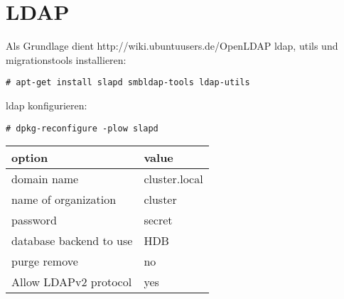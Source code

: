 \chapter{LDAP}
Als Grundlage dient http://wiki.ubuntuusers.de/OpenLDAP
ldap, utils und migrationstools installieren:
\begin{lstlisting}[style=Bash]
# apt-get install slapd smbldap-tools ldap-utils
\end{lstlisting}
ldap konfigurieren:
\begin{lstlisting}[style=Bash]
# dpkg-reconfigure -plow slapd
\end{lstlisting}
\begin{tabular}{ l | l }
 option & value\\
 \hline
 domain name & cluster.local\\
 name of organization & cluster\\
 password & secret\\
 database backend to use & HDB\\
 purge remove & no\\
 Allow LDAPv2 protocol & yes\\
\end{tabular}
